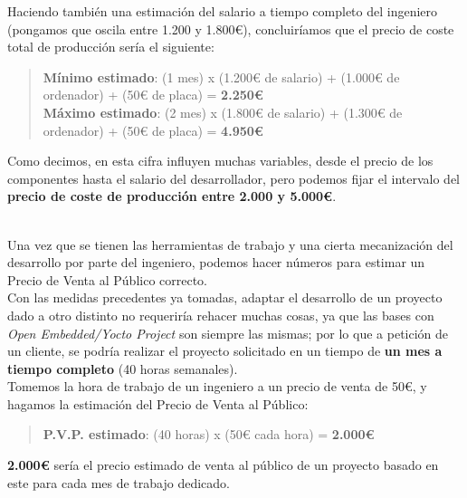 Haciendo también una estimación del salario a tiempo completo del ingeniero (pongamos que oscila entre 1.200 y 1.800€), concluiríamos que el precio de coste total de producción sería el siguiente:

\begin{quotation}
	\textbf{Mínimo estimado\textit{}}: (1 mes) x (1.200€ de salario) + (1.000€ de ordenador) + (50€ de placa) = \textbf{2.250€}\\
	
	\textbf{Máximo estimado\textit{}}: (2 mes) x (1.800€ de salario) + (1.300€ de ordenador) + (50€ de placa) = \textbf{4.950€}
\end{quotation}

Como decimos, en esta cifra influyen muchas variables, desde el precio de los componentes hasta el salario del desarrollador, pero podemos fijar el intervalo del \textbf{precio de coste de producción entre 2.000 y 5.000€}. 

\noindent\makebox[\linewidth]{\rule{\textwidth}{0.4pt}}\\

Una vez que se tienen las herramientas de trabajo y una cierta mecanización del desarrollo por parte del ingeniero, podemos hacer números para estimar un Precio de Venta al Público correcto.\\

Con las medidas precedentes ya tomadas, adaptar el desarrollo de un proyecto dado a otro distinto no requeriría rehacer muchas cosas, ya que las bases con \textit{Open Embedded/Yocto Project} son siempre las mismas; por lo que a petición de un cliente, se podría realizar el proyecto solicitado en un tiempo de \textbf{un mes a tiempo completo} (40 horas semanales).\\

Tomemos la hora de trabajo de un ingeniero a un precio de venta de 50€, y hagamos la estimación del Precio de Venta al Público:

\begin{quotation}
	\textbf{P.V.P. estimado}: (40 horas) x (50€ cada hora) = \textbf{2.000€}
\end{quotation}

\textbf{2.000€} sería el precio estimado de venta al público de un proyecto basado en este para cada mes de trabajo dedicado.

\newpage